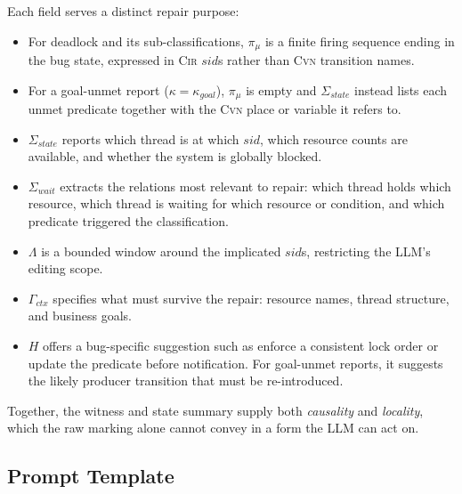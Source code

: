 \documentclass{article}
\begin{document}
Each field serves a distinct repair purpose:

\begin{itemize}[leftmargin=1.5em]
  \item For deadlock and its sub-classifications, $\pi_{\mu}$ is a finite firing sequence ending in the bug state, expressed in \textsc{Cir} $\mathit{sid}$s rather than \textsc{Cvn} transition names.

  \item For a goal-unmet report ($\kappa=\kappa_{goal}$), $\pi_{\mu}$ is empty and $\Sigma_{\mathit{state}}$ instead lists each unmet predicate together with the \textsc{Cvn} place or variable it refers to.

  \item $\Sigma_{\mathit{state}}$ reports which thread is at which $\mathit{sid}$, which resource counts are available, and whether the system is globally blocked.

  \item $\Sigma_{\mathit{wait}}$ extracts the relations most relevant to repair: which thread holds which resource, which thread is waiting for which resource or condition, and which predicate triggered the classification.

  \item $\Lambda$ is a bounded window around the implicated $\mathit{sid}$s, restricting the LLM's editing scope.

  \item $\Gamma_{\mathit{ctx}}$ specifies what must survive the repair: resource names, thread structure, and business goals.

  \item $H$ offers a bug-specific suggestion such as enforce a consistent lock order or update the predicate before notification. For goal-unmet reports, it suggests the likely producer transition that must be re-introduced.
\end{itemize}

Together, the witness and state summary supply both \emph{causality} and \emph{locality}, which the raw marking alone cannot convey in a form the LLM can act on.

\subsection{Prompt Template}
\end{document}
